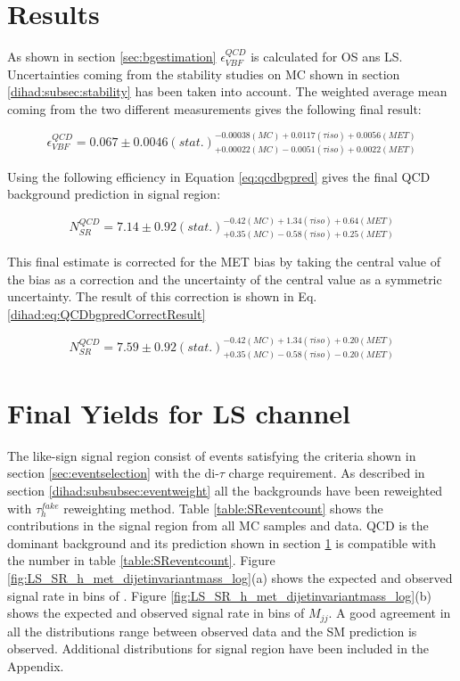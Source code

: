 \section{Results}
\label{section:results}

As shown in section \ref{sec:bgestimation} $\epsilon^{QCD}_{VBF}$ is calculated for OS ans LS. Uncertainties coming from the stability studies on MC shown in section \ref{dihad:subsec:stability} has been taken into account. The weighted average mean coming from the two different measurements gives the following final result:

\begin{equation}
\epsilon^{QCD}_{VBF} = 0.067\pm0.0046(stat.)^{-0.00038(MC)+0.0117(\tau iso)+0.0056(MET)}_{+0.00022(MC)-0.0051(\tau iso)+0.0022(MET)}
\label{eq:vbfefflsresult}
\end{equation}

Using the following efficiency in Equation \ref{eq:qcdbgpred} gives the final QCD background prediction in signal region:

\begin{equation}
N^{QCD}_{SR} = 7.14\pm0.92(stat.)^{-0.42(MC)+1.34(\tau iso)+0.64(MET)}_{+0.35(MC)-0.58(\tau iso)+0.25(MET)}
\label{eq:QCDbgpredresult}
\end{equation}

This final estimate is corrected for the MET bias by taking the central value of the  bias as a correction and 
the uncertainty of the central value as a symmetric uncertainty. The result of this correction is shown in Eq.
\ref{dihad:eq:QCDbgpredCorrectResult}

\begin{equation}
N^{QCD}_{SR} = 7.59\pm0.92(stat.)^{-0.42(MC)+1.34(\tau iso)+0.20(MET)}_{+0.35(MC)-0.58(\tau iso)-0.20(MET)}
\label{dihad:eq:QCDbgpredCorrectResult}
\end{equation}

\section{Final Yields for LS channel}

The like-sign signal region consist of events satisfying the criteria shown in section \ref{sec:eventselection} with the di-$\tau$ charge requirement. As described in section \ref{dihad:subsubsec:eventweight} all the backgrounds have been reweighted with $\tau_{h}^{fake}$ reweighting method. Table \ref{table:SReventcount} shows the contributions in the signal region from all MC samples and data.  QCD is the dominant background and its prediction shown in section \ref{section:results} is compatible with the number in table \ref{table:SReventcount}. Figure \ref{fig:LS_SR_h_met_dijetinvariantmass_log}(a) shows the expected and observed signal rate in bins of \met. Figure \ref{fig:LS_SR_h_met_dijetinvariantmass_log}(b) shows the expected and observed signal rate in bins of $M_{jj}$. A good agreement in all the distributions range between observed data and the SM prediction is observed. Additional distributions for signal region have been included in the Appendix.

